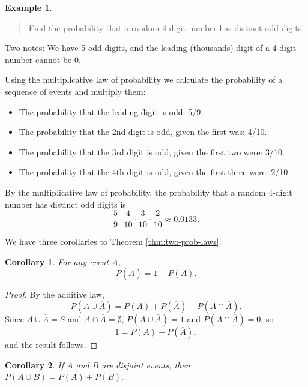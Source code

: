 \documentclass[
]{book}
\providecommand{\tightlist}{%
  \setlength{\itemsep}{0pt}\setlength{\parskip}{0pt}}
\newtheorem{corollary}{Corollary}[chapter]
\theoremstyle{definition}
\theoremstyle{definition}
\newtheorem{example}{Example}[chapter]
\theoremstyle{definition}
\theoremstyle{definition}
\theoremstyle{remark}
\begin{document}
\begin{example}
\protect\hypertarget{exm:mult-law}{}\label{exm:mult-law}\leavevmode

\begin{quote}
Find the probability that a random 4 digit number has distinct odd digits.
\end{quote}

Two notes: We have 5 odd digits, and the leading (thousands) digit of a 4-digit number cannot be 0.

Using the multiplicative law of probability we calculate the probability of a sequence of events and multiply them:

\begin{itemize}
\tightlist
\item
  The probability that the leading digit is odd: 5/9.
\item
  The probability that the 2nd digit is odd, given the first was: 4/10.
\item
  The probability that the 3rd digit is odd, given the first two were: 3/10.
\item
  The probability that the 4th digit is odd, given the first three were: 2/10.
\end{itemize}

By the multiplicative law of probability, the probability that a random 4-digit number has distinct odd digits is \[\frac{5}{9} \cdot \frac{4}{10} \cdot \frac{3}{10} \cdot \frac{2}{10} \approx 0.0133.\]

\end{example}

We have three corollaries to Theorem \ref{thm:two-prob-laws}.

\begin{corollary}
\protect\hypertarget{cor:comp-prob}{}\label{cor:comp-prob}For any event \(A\), \[P(\overline{A}) = 1 - P(A).\]
\end{corollary}

\begin{proof}
By the additive law, \[P(A \cup \overline{A}) = P(A) + P(\overline{A})-P(A \cap \overline{A}).\]
Since \(A\cup \overline{A} = S\) and \(A \cap \overline{A} = \emptyset\), \(P(A \cup \overline{A}) = 1\) and \(P(A \cap \overline{A}) = 0\), so \[1 = P(A) + P(\overline{A}),\] and the result follows.
\end{proof}

\begin{corollary}
If \(A\) and \(B\) are disjoint events, then \(P(A \cup B) = P(A) + P(B).\)
\end{corollary}
\end{document}
